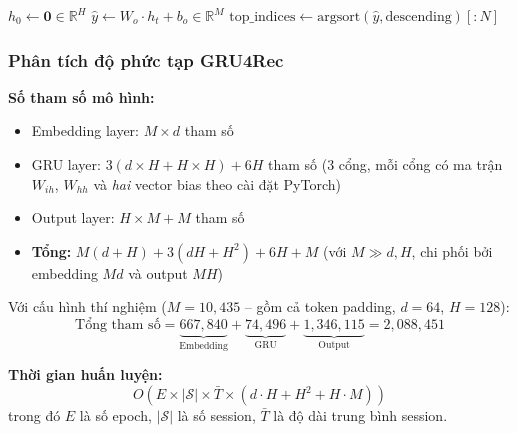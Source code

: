 \documentclass[12pt, a4paper]{article}
\begin{document}
\begin{algorithm}[H]
\SetAlgoLined
{}

\BlankLine
$h_0 \leftarrow \mathbf{0} \in \mathbb{R}^H$\;
\BlankLine
{}
$\hat{y} \leftarrow W_o \cdot h_t + b_o \in \mathbb{R}^M$\;
\BlankLine
{}
\BlankLine
{}
$\text{top\_indices} \leftarrow \text{argsort}(\hat{y}, \text{descending})[:N]$\;

\caption{GRU4Rec -- quy trình dự đoán}
\label{alg:gru4rec_predict}
\end{algorithm}

\subsubsection{Phân tích độ phức tạp GRU4Rec}

\textbf{Số tham số mô hình:}
\begin{itemize}
    \item Embedding layer: $M \times d$ tham số
    \item GRU layer: $3(d \times H + H \times H) + 6H$ tham số (3 cổng, mỗi cổng có ma trận $W_{ih}$, $W_{hh}$ và \emph{hai} vector bias theo cài đặt PyTorch)
    \item Output layer: $H \times M + M$ tham số
    \item \textbf{Tổng:} $M(d + H) + 3(dH + H^2) + 6H + M$ (với $M \gg d, H$, chi phối bởi embedding $Md$ và output $MH$)
\end{itemize}

Với cấu hình thí nghiệm ($M = 10{,}435$ -- gồm cả token padding, $d = 64$, $H = 128$):
\begin{equation}
    \text{Tổng tham số} = \underbrace{667{,}840}_{\text{Embedding}} + \underbrace{74{,}496}_{\text{GRU}} + \underbrace{1{,}346{,}115}_{\text{Output}} = 2{,}088{,}451
\end{equation}

\textbf{Thời gian huấn luyện:}
\begin{equation}
    O(E \times |\mathcal{S}| \times \bar{T} \times (d \cdot H + H^2 + H \cdot M))
\end{equation}
trong đó $E$ là số epoch, $|\mathcal{S}|$ là số session, $\bar{T}$ là độ dài trung bình session.
\end{document}
